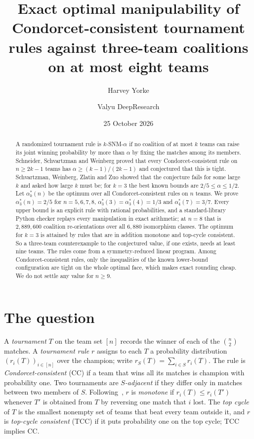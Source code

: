 \documentclass[11pt]{amsart}
\title[Three-team manipulation of tournament rules on at most eight teams]{Exact optimal manipulability of Condorcet-consistent tournament rules against three-team coalitions on at most eight teams}
\author{Harvey Yorke}
\author{Valyu DeepResearch}
\date{25 October 2026}
\theoremstyle{definition}
\theoremstyle{remark}
\begin{document}
\raggedbottom
\begin{abstract}
A randomized tournament rule is $k$-SNM-$\alpha$ if no coalition of at most $k$ teams can raise its joint winning probability by more than $\alpha$ by fixing the matches among its members. Schneider, Schvartzman and Weinberg proved that every Condorcet-consistent rule on $n\ge 2k-1$ teams has $\alpha\ge (k-1)/(2k-1)$ and conjectured that this is tight. Schvartzman, Weinberg, Zlatin and Zuo showed that the conjecture fails for some large $k$ and asked how large $k$ must be; for $k=3$ the best known bounds are $2/5\le\alpha\le 1/2$. Let $\alpha^*_k(n)$ be the optimum over all Condorcet-consistent rules on $n$ teams. We prove $\alpha^*_3(n)=2/5$ for $n=5,6,7,8$, $\alpha^*_3(3)=\alpha^*_3(4)=1/3$ and $\alpha^*_4(7)=3/7$. Every upper bound is an explicit rule with rational probabilities, and a standard-library Python checker replays every manipulation in exact arithmetic; at $n=8$ that is $2{,}889{,}600$ coalition re-orientations over all $6{,}880$ isomorphism classes. The optimum for $k=3$ is attained by rules that are in addition monotone and top-cycle consistent. So a three-team counterexample to the conjectured value, if one exists, needs at least nine teams. The rules come from a symmetry-reduced linear program. Among Condorcet-consistent rules, only the inequalities of the known lower-bound configuration are tight on the whole optimal face, which makes exact rounding cheap. We do not settle any value for $n\ge 9$.
\end{abstract}
\maketitle

\section{The question}

A \emph{tournament} $T$ on the team set $[n]$ records the winner of each of the $\binom n2$ matches. A \emph{tournament rule} $r$ assigns to each $T$ a probability distribution $(r_i(T))_{i\in[n]}$ over the champion; write $r_S(T)=\sum_{i\in S}r_i(T)$. The rule is \emph{Condorcet-consistent} (CC) if a team that wins all its matches is champion with probability one. Two tournaments are \emph{$S$-adjacent} if they differ only in matches between two members of $S$. Following~\cite{SSW17}, $r$ is \emph{monotone} if $r_i(T)\le r_i(T')$ whenever $T'$ is obtained from $T$ by reversing one match that $i$ lost. The \emph{top cycle} of $T$ is the smallest nonempty set of teams that beat every team outside it, and $r$ is \emph{top-cycle consistent} (TCC) if it puts probability one on the top cycle; TCC implies CC.
\end{document}
